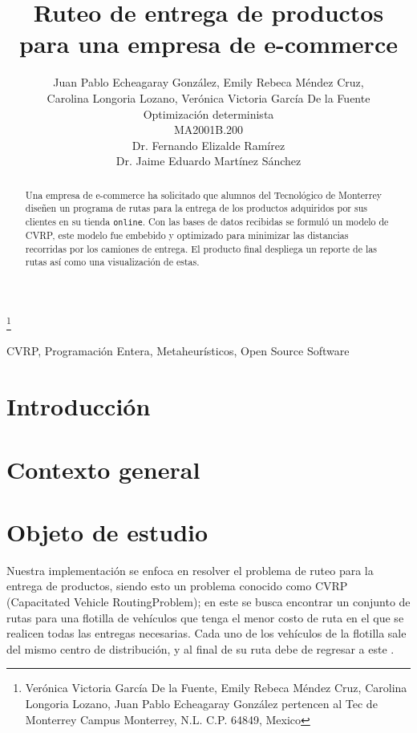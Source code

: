 \documentclass[journal]{IEEEtran}
\title{\LARGE \bf Ruteo de entrega de productos para una empresa de e-commerce}
\author{Juan Pablo Echeagaray González, Emily Rebeca Méndez Cruz, \\Carolina Longoria Lozano, Verónica Victoria García De la Fuente \\
Optimización determinista \\
MA2001B.200 \\
Dr. Fernando Elizalde Ramírez \\
Dr. Jaime Eduardo Martínez Sánchez}%
\begin{document}
    \thanks{Verónica Victoria García De la Fuente, Emily Rebeca Méndez Cruz, Carolina Longoria Lozano, Juan Pablo Echeagaray González pertencen al Tec de Monterrey Campus Monterrey, N.L. C.P. 64849, Mexico {\tt\small}}

    \maketitle

    \thispagestyle{empty}
    \pagestyle{empty}

    \begin{abstract}
        Una empresa de e-commerce ha solicitado que alumnos del Tecnológico de Monterrey diseñen un programa de rutas para la entrega de los productos adquiridos por sus clientes en su tienda \texttt{online}. Con las bases de datos recibidas se formuló un modelo de CVRP, este modelo fue embebido y optimizado para minimizar las distancias recorridas por los camiones de entrega. El producto final despliega un reporte de las rutas así como una visualización de estas.
    \end{abstract}

    \begin{IEEEkeywords} 
        CVRP, Programación Entera, Metaheurísticos, Open Source Software
    \end{IEEEkeywords}

    \section{Introducción} \label{sec:intro} %

    \section{Contexto general} \label{sec:general-context}
        
    \section{Objeto de estudio} \label{sec:case-study}

        Nuestra implementación se enfoca en resolver el problema de ruteo para la entrega de productos, siendo esto un problema conocido como CVRP (Capacitated Vehicle RoutingProblem); en este se busca encontrar un conjunto de rutas para una flotilla de vehículos que tenga el menor costo de ruta en el que se realicen todas las entregas necesarias. Cada uno de los vehículos de la flotilla sale del mismo centro de distribución, y al final de su ruta debe de regresar a este \cite{elshaer2020taxonomic}.
\end{document}

